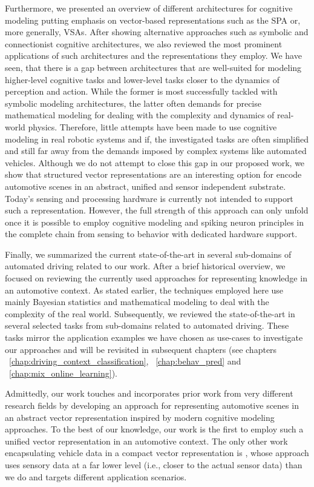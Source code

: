 Furthermore, we presented an overview of different architectures for cognitive modeling putting emphasis on vector-based representations such as the \ac{SPA} or, more generally, \acp{VSA}.
After showing alternative approaches such as symbolic and connectionist cognitive architectures, we also reviewed the most prominent applications of such architectures and the representations they employ.
We have seen, that there is a gap between architectures that are well-suited for modeling higher-level cognitive tasks and lower-level tasks closer to the dynamics of perception and action.
While the former is most successfully tackled with symbolic modeling architectures, the latter often demands for precise mathematical modeling for dealing with the complexity and dynamics of real-world physics.
Therefore, little attempts have been made to use cognitive modeling in real robotic systems and if, the investigated tasks are often simplified \cite{Neubert2016} and still far away from the demands imposed by complex systems like automated vehicles.
Although we do not attempt to close this gap in our proposed work, we show that structured vector representations are an interesting option for encode automotive scenes in an abstract, unified and sensor independent substrate.
Today's sensing and processing hardware is currently not intended to support such a representation.
However, the full strength of this approach can only unfold once it is possible to employ cognitive modeling and spiking neuron principles in the complete chain from sensing to behavior with dedicated hardware support.

Finally, we summarized the current state-of-the-art in several sub-domains of automated driving related to our work.
After a brief historical overview, we focused on reviewing the currently used approaches for representing knowledge in an automotive context.
As stated earlier, the techniques employed here use mainly Bayesian statistics and mathematical modeling to deal with the complexity of the real world.
Subsequently, we reviewed the state-of-the-art in several selected tasks from sub-domains related to automated driving.
These tasks mirror the application examples we have chosen as use-cases to investigate our approaches and will be revisited in subsequent chapters (see chapters ~\ref{chap:driving_context_classification}, ~\ref{chap:behav_pred} and ~\ref{chap:mix_online_learning}).

Admittedly, our work touches and incorporates prior work from very different research fields by developing an approach for representing automotive scenes in an abstract vector representation inspired by modern cognitive modeling approaches.
To the best of our knowledge, our work is the first to employ such a unified vector representation in an automotive context.
The only other work encapsulating vehicle data in a compact vector representation is \cite{Hallac2018}, whose approach uses sensory data at a far lower level (i.e., closer to the actual sensor data) than we do and targets different application scenarios.

